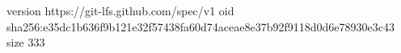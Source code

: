 version https://git-lfs.github.com/spec/v1
oid sha256:e35dc1b636f9b121e32f57438fa60d74aceae8e37b92f9118d0d6e78930e3c43
size 333
